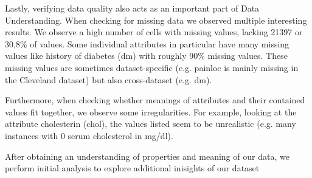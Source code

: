 Lastly, verifying data quality also acts as an important part of Data Understanding. When checking for missing data we observed multiple interesting results. We observe a high number of cells with missing values, lacking 21397 or 30,8\% of values. Some individual attributes in particular have many missing values like history of diabetes (dm) with roughly 90\% missing values. These missing values are sometimes dataset-specific (e.g. painloc is mainly missing in the Cleveland dataset) but also cross-dataset (e.g. dm). 

Furthermore, when checking whether meanings of attributes and their contained values fit together, we observe some irregularities. For example, looking at the attribute cholesterin (chol), the values listed seem to be unrealistic (e.g. many instances with 0 serum cholesterol in mg/dl). 

After obtaining an understanding of properties and meaning of our data, we perform initial analysis to explore additional inisights of our dataset 


